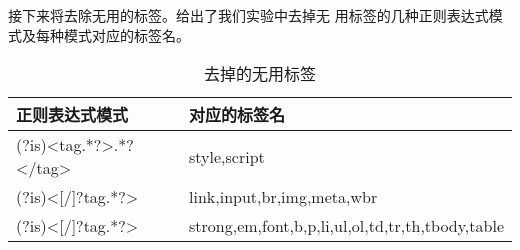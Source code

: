接下来将去除无用的标签。给出了我们实验中去掉无
用标签的几种正则表达式模式及每种模式对应的标签名。
\begin{table}[h]
  \centering
  \caption{去掉的无用标签}
  \label{experiment:tab:uselesstags}
\begin{tabular}{ll}
  \toprule
正则表达式模式 & 对应的标签名 \\
\hline
(?is)<tag.*?>.*?</tag> & style,script \\
(?is)<[/]?tag.*?> & link,input,br,img,meta,wbr \\
(?is)<[/]?tag.*?> & strong,em,font,b,p,li,ul,ol,td,tr,th,tbody,table \\
\bottomrule
\end{tabular}
\end{table}
\begin{comment}
#+ORGTBL: SEND 无用标签 orgtbl-to-latex :splice nil :skip 0
| 正则表达式模式         | 对应的标签名                                     |
|------------------------+--------------------------------------------------|
| (?is)<tag.*?>.*?</tag> | style,script                                     |
| (?is)<[/]?tag.*?>      | link,input,br,img,meta,wbr                       |
| (?is)<[/]?tag.*?>      | strong,em,font,b,p,li,ul,ol,td,tr,th,tbody,table |
\end{comment}

